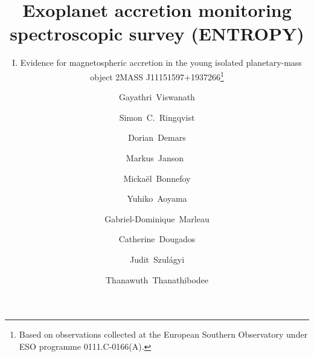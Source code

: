 \documentclass{aa}
\begin{document}
 
   \title{Exoplanet accretion monitoring spectroscopic survey (ENTROPY)}
\subtitle{I. Evidence for magnetospheric accretion in the young isolated planetary-mass object 2MASS J11151597+1937266\thanks{Based on observations collected at the European Southern Observatory under ESO programme 0111.C-0166(A).}}

   \author{Gayathri~Viswanath
          \inst{\ref{stockholm}}
          \and
          Simon~C.~Ringqvist%
          \inst{\ref{stockholm}}
          \and
          Dorian~Demars%
          \inst{\ref{grenoble}}
          \and
          Markus~Janson\inst{\ref{stockholm}}\
          \and
          Micka{\"e}l~Bonnefoy\inst{\ref{grenoble}}
          \and
          Yuhiko~Aoyama\inst{\ref{tsinghua_adv}, \ref{tsinghua_astro}, \ref{tokyo}}
          \and
          Gabriel-Dominique~Marleau\inst{\ref{heidelberg}, \ref{duisburg}, \ref{tubingen}, \ref{bern}}
          \and
          Catherine~Dougados\inst{\ref{grenoble}}
          \and
          Judit~Szul\'agyi\inst{\ref{eth}}
          \and 
          Thanawuth~Thanathibodee\inst{\ref{umichigan}, \ref{uboston}}
          }
\end{document}
